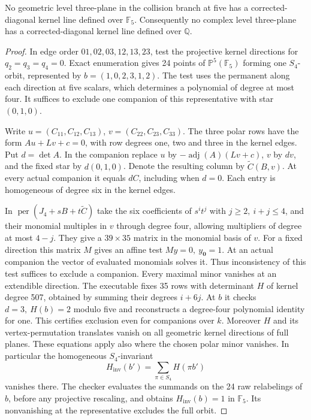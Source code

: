 \begin{proposition}
\label{prop:rational-kernel-exclusion}
No geometric level three-plane in the collision branch at five has a
corrected-diagonal kernel line defined over \(\mathbb F_5\).
Consequently no complex level three-plane has a corrected-diagonal
kernel line defined over \(\mathbb Q\).
\end{proposition}
\begin{proof}
In edge order \(01,02,03,12,13,23\), test the projective kernel
directions for \(q_2=q_3=q_4=0\). Exact enumeration gives 24 points
of \(\mathbb P^5(\mathbb F_5)\) forming one \(S_4\)-orbit, represented
by \(b=(1,0,2,3,1,2)\). The test uses the permanent along each
direction at five scalars, which determines a polynomial of degree
at most four. It suffices to exclude one companion of this
representative with star \((0,1,0)\).

Write \(u=(C_{11},C_{12},C_{13})\), \(v=(C_{22},C_{23},C_{33})\).
The three polar rows have the form \(A u+L v+c=0\), with row degrees
one, two and three in the kernel edges. Put \(d=\det A\). In the
companion replace \(u\) by \(-\operatorname{adj}(A)(Lv+c)\), \(v\)
by \(dv\), and the fixed star by \(d(0,1,0)\). Denote the resulting
column by \(\widetilde C(B,v)\). At every actual companion it equals
\(dC\), including when \(d=0\). Each entry is homogeneous of degree
six in the kernel edges.

In \(\operatorname{per}(J_4+sB+t\widetilde C)\) take the six
coefficients of \(s^it^j\) with \(j\ge2,\ i+j\le4\), and their
monomial multiples in \(v\) through degree four, allowing multipliers
of degree at most \(4-j\). They give a \(39\times35\) matrix in the
monomial basis of \(v\). For a fixed direction this matrix \(M\) gives
an affine test \(My=0,\ y_{\boldsymbol 0}=1\). At an actual companion
the vector of evaluated monomials solves it. Thus inconsistency of
this test suffices to exclude a companion.
Every maximal minor vanishes at an extendible direction. The executable fixes 35
rows with determinant \(H\) of kernel degree 507, obtained by summing
their degrees \(i+6j\). At \(b\) it checks \(d=3,\ H(b)=2\) modulo
five and reconstructs a degree-four polynomial identity for one.
This certifies exclusion even for companions over \(k\).
Moreover \(H\) and its vertex-permutation translates vanish on all
geometric kernel directions of full planes. These equations apply
also where the chosen polar minor vanishes. In particular the
homogeneous \(S_4\)-invariant
\[
 H_{\mathrm{inv}}(b')=\sum_{\pi\in S_4}H(\pi b')
\]
vanishes there. The checker evaluates the summands on the 24 raw
relabelings of \(b\), before any projective rescaling, and obtains
\(H_{\mathrm{inv}}(b)=1\) in \(\mathbb F_5\). Its nonvanishing at
the representative excludes the full orbit.


\end{proof}
